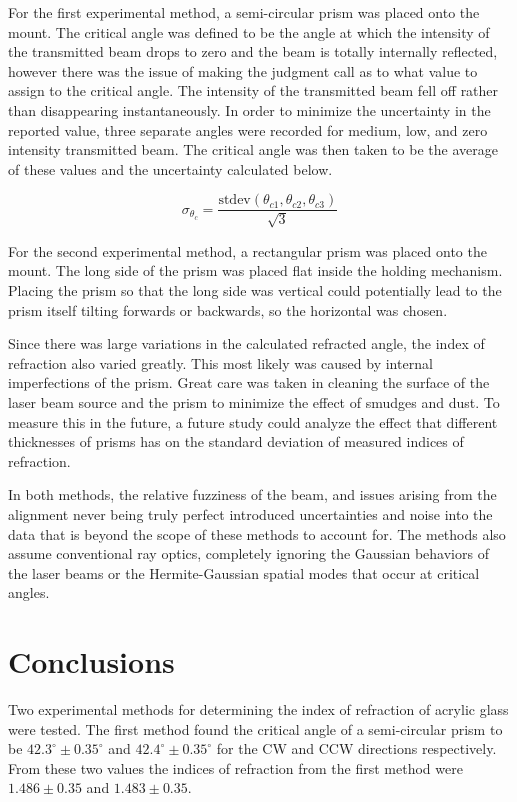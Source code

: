 \documentclass[colorlinks=true,pdfstartview=FitV,linkcolor=blue,
            citecolor=red,urlcolor=magenta]{basedoc}
\begin{document}
  For the first experimental method, a semi-circular prism was placed onto the mount. The critical angle was defined to be the angle at which the intensity of the transmitted beam drops to zero and the beam is totally internally reflected, however there was the issue of making the judgment call as to what value to assign to the critical angle. The intensity of the transmitted beam fell off rather than disappearing instantaneously. In order to minimize the uncertainty in the reported value, three separate angles were recorded for medium, low, and zero intensity transmitted beam. The critical angle was then taken to be the average of these values and the uncertainty calculated below.

  \begin{equation} \label{eq:sigma_theta_c}
      \sigma_{\theta_c} = \frac {\text{stdev}(\theta_{c1}, \theta_{c2}, \theta_{c3})} {\sqrt{3}}
  \end{equation}

  For the second experimental method, a rectangular prism was placed onto the mount. The long side of the prism was placed flat inside the holding mechanism. Placing the prism so that the long side was vertical could potentially lead to the prism itself tilting forwards or backwards, so the horizontal was chosen.

  Since there was large variations in the calculated refracted angle, the index of refraction also varied greatly. This most likely was caused by internal imperfections of the prism. Great care was taken in cleaning the surface of the laser beam source and the prism to minimize the effect of smudges and dust. To measure this in the future, a future study could analyze the effect that different thicknesses of prisms has on the standard deviation of measured indices of refraction.

  In both methods, the relative fuzziness of the beam, and issues arising from the alignment never being truly perfect introduced uncertainties and noise into the data that is beyond the scope of these methods to account for. The methods also assume conventional ray optics, completely ignoring the Gaussian behaviors of the laser beams or the Hermite-Gaussian spatial modes that occur at critical angles.


\section{Conclusions}
  Two experimental methods for determining the index of refraction of acrylic glass were tested. The first method found the critical angle of a semi-circular prism to be $42.3^{\circ} \pm 0.35^{\circ}$ and $42.4^{\circ} \pm 0.35^{\circ}$ for the CW and CCW directions respectively. From these two values the indices of refraction from the first method were $1.486 \pm 0.35$ and $1.483 \pm 0.35$.
\end{document}
